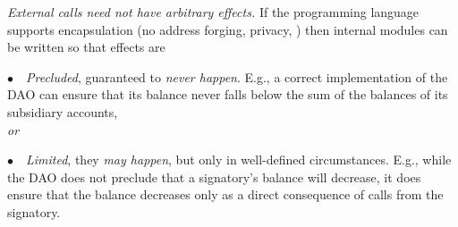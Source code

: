 %
% 
%

 
 {\em{External calls  need not have  arbitrary   effects.}}
If the programming language supports encapsulation (\eg no address forging, privacy,
 \etc) then internal modules can be  written %
so  that effects are  %

 \begin{customquote}
$\bullet$\ \ \emph{Precluded}, \ie  guaranteed to \emph{never happen}.
 E.g., a  correct  %
 implementation of the DAO  \cite{Dao}  can ensure that  
 its balance never falls below the sum of the balances of its subsidiary accounts, \\ \emph{or}


 $\bullet$\ \  \emph{Limited}, \ie  they  \emph{may happen}, but
 only in well-defined circumstances.
E.g., while the DAO does not preclude that a signatory's balance will decrease, it  does ensure that the balance decreases only
as a direct consequence of calls from the signatory.
 
 \end{customquote}
 
